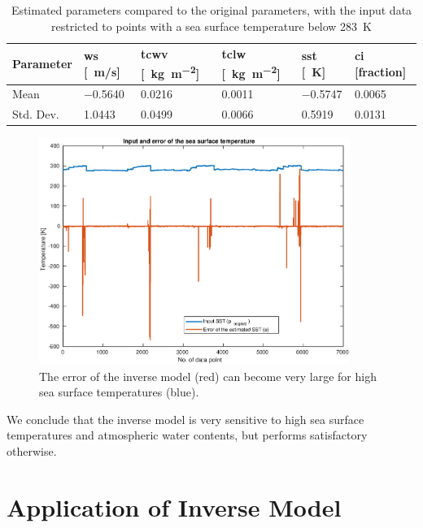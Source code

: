 \documentclass[11pt, a4paper]{article}
\begin{document}
\begin{table}[h]
\centering
\begin{tabular}{@{} l l l l l l @{}}
Parameter & ws [\SI{}{m/s}] & tcwv [\SI{}{\kilo\gram\per\square\meter}] & tclw [\SI{}{\kilo\gram\per\square\meter}] & sst [\SI{}{K}] & ci [fraction] \\
\midrule
Mean & \SI{-0.5640}{} & \SI{0.0216}{} & \SI{0.0011}{} & \SI{-0.5747}{} & \SI{0.0065}{} \\
Std. Dev. & \SI{1.0443}{} & \SI{0.0499}{} & \SI{0.0066}{} & \SI{0.5919}{} & \SI{0.0131}{} \\
\midrule
\end{tabular}
\caption{Estimated parameters compared to the original parameters, with the input data restricted to points with a sea surface temperature below \SI{283}{K}}
\label{tab:errorinvrest}
\end{table}


\begin{figure}[h]
   \centering
   \includegraphics[width=0.9\textwidth]{ValidationInverse_SIC0_sstError.eps}
   \caption{The error of the inverse model (red) can become very large for high sea surface temperatures (blue).}
   \label{fig:sstError}
\end{figure}

We conclude that the inverse model is very sensitive to high sea surface temperatures and atmospheric water contents, but performs satisfactory otherwise.

\clearpage

	\section{Application of Inverse Model}
\end{document}
